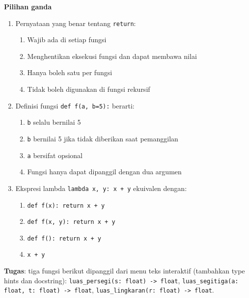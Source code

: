 ﻿\documentclass[../main.tex]{subfiles}
\begin{document}
\begin{asesmen}
\textbf{Pilihan ganda}

\begin{enumerate}
  \item Pernyataan yang benar tentang \texttt{return}:
  \begin{enumerate}
    \item Wajib ada di setiap fungsi
    \item Menghentikan eksekusi fungsi dan dapat membawa nilai
    \item Hanya boleh satu per fungsi
    \item Tidak boleh digunakan di fungsi rekursif
  \end{enumerate}
  \item Definisi fungsi \texttt{def f(a, b=5):} berarti:
  \begin{enumerate}
    \item \texttt{b} selalu bernilai 5
    \item \texttt{b} bernilai 5 jika tidak diberikan saat pemanggilan
    \item \texttt{a} bersifat opsional
    \item Fungsi hanya dapat dipanggil dengan dua argumen
  \end{enumerate}
  \item Ekspresi lambda \texttt{lambda x, y: x + y} ekuivalen dengan:
  \begin{enumerate}
    \item \texttt{def f(x): return x + y}
    \item \texttt{def f(x, y): return x + y}
    \item \texttt{def f(): return x + y}
    \item \texttt{x + y}
  \end{enumerate}
\end{enumerate}

\textbf{Tugas}: tiga fungsi berikut dipanggil dari menu teks interaktif (tambahkan type hints dan docstring):\newline
\texttt{luas\_persegi(s: float) -> float},\newline
\texttt{luas\_segitiga(a: float, t: float) -> float},\newline
\texttt{luas\_lingkaran(r: float) -> float}.
\end{asesmen}
\end{document}
